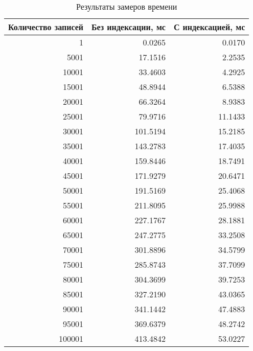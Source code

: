 \begin{table}[H]
    \begin{center}
        \begin{threeparttable}
            \captionsetup{justification=raggedright, singlelinecheck=off}
            \caption{Результаты замеров времени}
            \label{tbl:time_mes}
            \begin{tabular}{|r|r|r|}
                \hline
                Количество записей & Без индексации, мс & С индексацией, мс \\ \hline
                1 & 0.0265 & 0.0170 \\ \hline
                5001 & 17.1516 & 2.2535 \\ \hline
                10001 & 33.4603 & 4.2925 \\ \hline
                15001 & 48.8944 & 6.5388 \\ \hline
                20001 & 66.3264 & 8.9383 \\ \hline
                25001 & 79.9716 & 11.1433 \\ \hline
                30001 & 101.5194 & 15.2185 \\ \hline
                35001 & 143.2783 & 17.4035 \\ \hline
                40001 & 159.8446 & 18.7491 \\ \hline
                45001 & 171.9279 & 20.6471 \\ \hline
                50001 & 191.5169 & 25.4068 \\ \hline
                55001 & 211.8095 & 25.9988 \\ \hline
                60001 & 227.1767 & 28.1881 \\ \hline
                65001 & 247.2775 & 33.2508 \\ \hline
                70001 & 301.8896 & 34.5799 \\ \hline
                75001 & 285.8743 & 37.7099 \\ \hline
                80001 & 304.3699 & 39.7253 \\ \hline
                85001 & 327.2190 & 43.0365 \\ \hline
                90001 & 341.1442 & 47.4883 \\ \hline
                95001 & 369.6379 & 48.2742 \\ \hline
                100001 & 413.4842 & 53.0227 \\ \hline
            \end{tabular}
        \end{threeparttable}
    \end{center}
\end{table}

